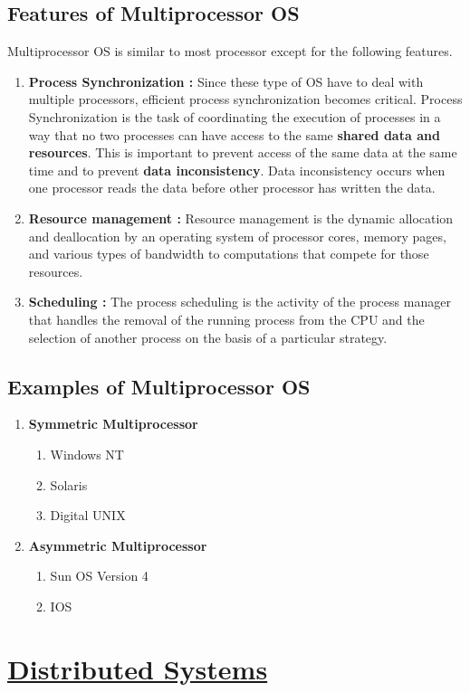 \documentclass{article}
\begin{document}
  \subsection{Features of Multiprocessor OS}
Multiprocessor OS is similar to most processor except for the following features.
\begin{enumerate}
    \item \textbf{Process Synchronization :} Since these type of OS have to deal with multiple processors, efficient process synchronization becomes critical. Process Synchronization is the task of coordinating the execution of processes in a way that no two processes can have access to the same \textbf{shared data and resources}. This is important to prevent access of the same data at the same time and to prevent \textbf{data inconsistency}. Data inconsistency occurs when one processor reads the data before other processor has written the data.
    \item \textbf{Resource management :} Resource management is the dynamic allocation and deallocation by an operating system of processor cores, memory pages, and various types of bandwidth to computations that compete for those resources.
    \item \textbf{Scheduling :} The process scheduling is the activity of the process manager that handles the removal of the running process from the CPU and the selection of another process on the basis of a particular strategy.
\end{enumerate}
\subsection{Examples of Multiprocessor OS}
\begin{enumerate}
    \item \textbf{Symmetric Multiprocessor}
    \begin{enumerate}
        \item Windows NT
        \item Solaris
        \item Digital UNIX
    \end{enumerate}
    \item \textbf{Asymmetric Multiprocessor}
    \begin{enumerate}
        \item Sun OS Version 4
        \item IOS
    \end{enumerate}
\end{enumerate}
\section{\underline{Distributed Systems}}
\end{document}
